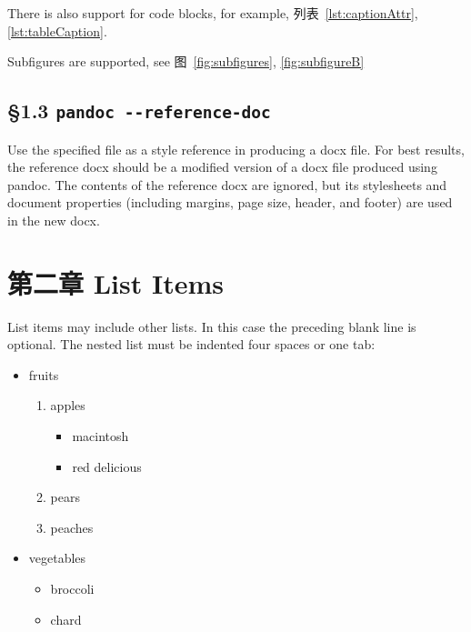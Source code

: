 \documentclass[]{article}
\providecommand{\tightlist}{%
  \setlength{\itemsep}{0pt}\setlength{\parskip}{0pt}}
\begin{document}
There is also support for code blocks, for example,
列表~\ref{lst:captionAttr}, \ref{lst:tableCaption}.

Subfigures are supported, see
图~\ref{fig:subfigures}, \ref{fig:subfigureB}

\hypertarget{sec:pandoc---reference-doc}{%
\subsection{\texorpdfstring{§1.3
\texttt{pandoc\ -\/-reference-doc}}{§1.3 pandoc -\/-reference-doc}}\label{sec:pandoc---reference-doc}}

Use the specified file as a style reference in producing a docx file.
For best results, the reference docx should be a modified version of a
docx file produced using pandoc. The contents of the reference docx are
ignored, but its stylesheets and document properties (including margins,
page size, header, and footer) are used in the new docx.

\hypertarget{sec:sec2}{%
\section{第二章 List Items}\label{sec:sec2}}

List items may include other lists. In this case the preceding blank
line is optional. The nested list must be indented four spaces or one
tab:

\begin{itemize}
\tightlist
\item
  fruits

  \begin{enumerate}
  \def\labelenumi{\arabic{enumi}.}
  \tightlist
  \item
    apples

    \begin{itemize}
    \tightlist
    \item
      macintosh
    \item
      red delicious
    \end{itemize}
  \item
    pears
  \item
    peaches
  \end{enumerate}
\item
  vegetables

  \begin{itemize}
  \tightlist
  \item
    broccoli
  \item
    chard
  \end{itemize}
\end{itemize}
\end{document}

